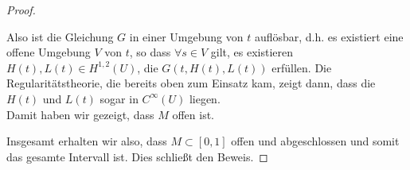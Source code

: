\begin{proof}
\begin{itemize}
	Also ist die Gleichung $G$ in einer Umgebung von $t$ auflösbar, d.h. es existiert eine offene Umgebung $V$ von $t$, so dass $\forall s \in V$ gilt, es existieren $H(t), L(t) \in H^{1,2}(U)$, die $G(t, H(t), L(t))$ erfüllen. Die Regularitätstheorie, die bereits oben zum Einsatz kam, zeigt dann, dass die $H(t)$ und $L(t)$ sogar in $C^\infty(U)$ liegen.\\
	Damit haben wir gezeigt, dass $M$ offen ist.
  \end{itemize}
  Insgesamt erhalten wir also, dass $M\subset [0,1]$ offen und abgeschlossen und somit das gesamte Intervall ist. Dies schließt den Beweis.
\end{proof}

